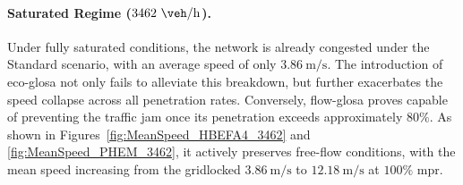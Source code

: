 \paragraph{Saturated Regime ($3462~\unit{\veh\per\hour}$).}
Under fully saturated conditions, the network is already congested under the Standard scenario, with an average speed of only $3.86~\unit{\metre\per\second}$. The introduction of \ac{eco-glosa} not only fails to alleviate this breakdown, but further exacerbates the speed collapse across all penetration rates. Conversely, \ac{flow-glosa} proves capable of preventing the traffic jam once its penetration exceeds approximately $80\%$. As shown in Figures~\vref{fig:MeanSpeed_HBEFA4_3462} and \vref{fig:MeanSpeed_PHEM_3462}, it actively preserves free-flow conditions, with the mean speed increasing from the gridlocked $3.86~\unit{\metre\per\second}$ to $12.18~\unit{\metre\per\second}$ at $100\%$ \ac{mpr}.

